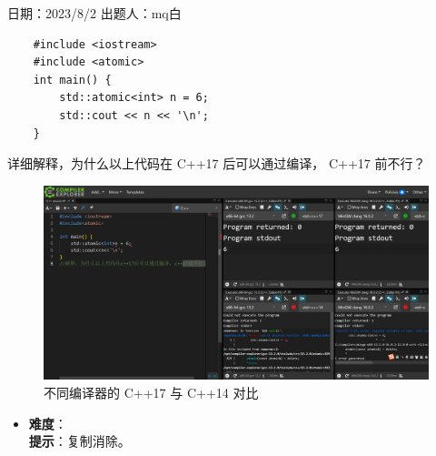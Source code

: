 日期：2023/8/2 出题人：mq白

\begin{verbatim}
    #include <iostream>
    #include <atomic>
    int main() {
        std::atomic<int> n = 6;
        std::cout << n << '\n';
    }
\end{verbatim}

详细解释，为什么以上代码在 C++17 后可以通过编译， C++17 前不行？

\begin{figure}[H]
    \caption{不同编译器的 C++17 与 C++14 对比} 
    \centering 
    \includegraphics[width = 1.0\textwidth]{image/06_atomic.png}
\end{figure}

\begin{itemize}
    \item \textbf{难度}：  \\
    \textbf{提示}：复制消除。
\end{itemize}